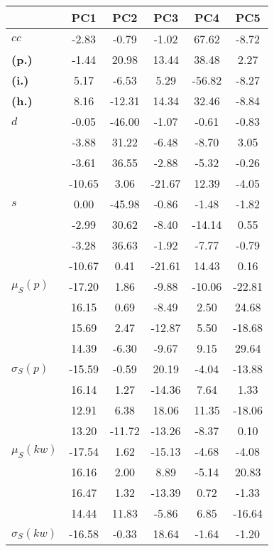 \begin{table}[h!]
\begin{center}
\begin{tabular}{| l || c | c | c | c | c |}\hline
 & {\bf PC1} & {\bf PC2} & {\bf PC3} & {\bf PC4} & {\bf PC5} \\\hline\hline
{\bf $cc$} & -2.83 & -0.79 & -1.02 & 67.62 & -8.72 \\
{\bf (p.)} & -1.44 & 20.98 & 13.44 & 38.48 & 2.27 \\
{\bf (i.)} & 5.17 & -6.53 & 5.29 & -56.82 & -8.27 \\
{\bf (h.)} & 8.16 & -12.31 & 14.34 & 32.46 & -8.84 \\\hline
{\bf $d$} & -0.05 & -46.00 & -1.07 & -0.61 & -0.83 \\
{\bf } & -3.88 & 31.22 & -6.48 & -8.70 & 3.05 \\
{\bf } & -3.61 & 36.55 & -2.88 & -5.32 & -0.26 \\
{\bf } & -10.65 & 3.06 & -21.67 & 12.39 & -4.05 \\\hline
{\bf $s$} & 0.00 & -45.98 & -0.86 & -1.48 & -1.82 \\
{\bf } & -2.99 & 30.62 & -8.40 & -14.14 & 0.55 \\
 & -3.28  & 36.63  & -1.92  & -7.77  & -0.79 \\
 & -10.67  & 0.41  & -21.61  & 14.43  & 0.16 \\\hline
$\mu_S(p)$ & -17.20  & 1.86  & -9.88  & -10.06  & -22.81 \\
 & 16.15  & 0.69  & -8.49  & 2.50  & 24.68 \\
 & 15.69  & 2.47  & -12.87  & 5.50  & -18.68 \\
 & 14.39  & -6.30  & -9.67  & 9.15  & 29.64 \\\hline
$\sigma_S(p)$ & -15.59  & -0.59  & 20.19  & -4.04  & -13.88 \\
 & 16.14  & 1.27  & -14.36  & 7.64  & 1.33 \\
 & 12.91  & 6.38  & 18.06  & 11.35  & -18.06 \\
 & 13.20  & -11.72  & -13.26  & -8.37  & 0.10 \\\hline
$\mu_S(kw)$ & -17.54  & 1.62  & -15.13  & -4.68  & -4.08 \\
 & 16.16  & 2.00  & 8.89  & -5.14  & 20.83 \\
 & 16.47  & 1.32  & -13.39  & 0.72  & -1.33 \\
 & 14.44  & 11.83  & -5.86  & 6.85  & -16.64 \\\hline
$\sigma_S(kw)$ & -16.58  & -0.33  & 18.64  & -1.64  & -1.20 \\

\end{tabular}
\end{center}
\end{table}
